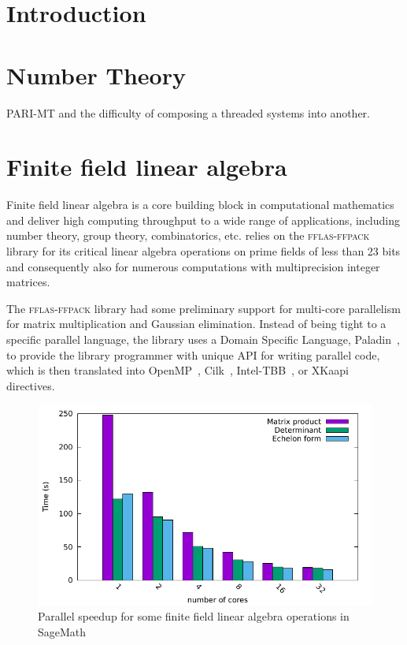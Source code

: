 \documentclass{deliverablereport}
\author{Author names}
\newcommand{\fflasffpack}{\textsc{fflas-ffpack}\xspace}
\begin{document}
\maketitle
\githubissuedescription



\section{Introduction}

\section{Number Theory}

PARI-MT and the difficulty of composing a threaded systems into another.

\section{Finite field linear algebra}

Finite field linear algebra is a core building block in computational mathematics and deliver high computing throughput
to a wide range of applications, including number theory, group theory, combinatorics, etc. \SageMath relies on the
\fflasffpack library for its critical linear algebra operations on prime fields of less than 23 bits and consequently
also for numerous computations with multiprecision integer matrices.  

The \fflasffpack library had some preliminary support for multi-core parallelism for matrix
multiplication and Gaussian elimination.
Instead of being tight to a specific parallel language, the library uses a Domain Specific Language, Paladin~\cite{},
to provide the library programmer with unique API for writing parallel code, which is then translated into 
OpenMP~\cite{}, Cilk~\cite{}, Intel-TBB~\cite{}, or XKaapi~\cite{} directives.


\begin{figure}[htb]
  \begin{center}
    \includegraphics[width=.8\textwidth]{Pictures/histo_bigfoot3}
    \caption{Parallel speedup for some finite field linear algebra operations in SageMath}
  \end{center}
\end{figure}
\end{document}
